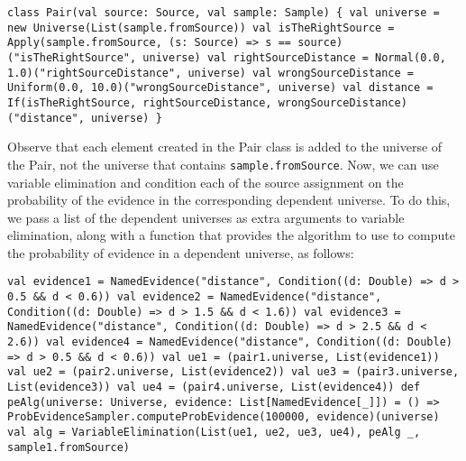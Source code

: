 \begin{flushleft}
\texttt{class Pair(val source: Source, val sample: Sample) \{ 
\newline \tab val universe = new Universe(List(sample.fromSource)) 
\newline \tab val isTheRightSource =
\newline \tab Apply(sample.fromSource, (s: Source) => s == source)("isTheRightSource", universe)
\newline \tab val rightSourceDistance = Normal(0.0, 1.0)("rightSourceDistance", universe)
\newline \tab val wrongSourceDistance = Uniform(0.0, 10.0)("wrongSourceDistance", universe)
\newline \tab val distance =
\newline \tab If(isTheRightSource, rightSourceDistance, wrongSourceDistance)("distance", universe)
\newline \} }
\end{flushleft}

Observe that each element created in the Pair class is added to the universe of the Pair, not the universe that contains \texttt{sample.fromSource}. Now, we can use variable elimination and condition each of the source assignment on the probability of the evidence in the corresponding dependent universe. To do this, we pass a list of the dependent universes as extra arguments to variable elimination, along
with a function that provides the algorithm to use to compute the probability of evidence in a dependent universe, as follows:

\begin{flushleft}
\texttt{val evidence1 = NamedEvidence("distance", Condition((d: Double) => d > 0.5 \&\& d < 0.6))
\newline val evidence2 = NamedEvidence("distance", Condition((d: Double) => d > 1.5 \&\& d < 1.6))
\newline val evidence3 = NamedEvidence("distance", Condition((d: Double) => d > 2.5 \&\& d < 2.6))
\newline val evidence4 = NamedEvidence("distance", Condition((d: Double) => d > 0.5 \&\& d < 0.6))
\newline val ue1 = (pair1.universe, List(evidence1))
\newline val ue2 = (pair2.universe, List(evidence2))
\newline val ue3 = (pair3.universe, List(evidence3))
\newline val ue4 = (pair4.universe, List(evidence4))
\newline def peAlg(universe: Universe, evidence: List[NamedEvidence[\_]]) = () => 
\newline ProbEvidenceSampler.computeProbEvidence(100000, evidence)(universe)
\newline val alg = VariableElimination(List(ue1, ue2, ue3, ue4), peAlg \_, sample1.fromSource)}
\end{flushleft}


